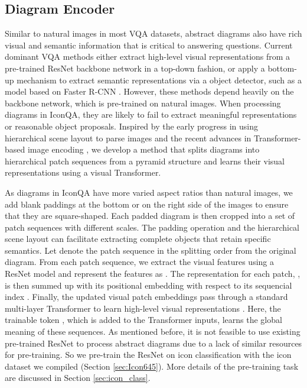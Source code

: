 \documentclass{article}
\begin{document}
\subsection{Diagram Encoder}
Similar to natural images in most VQA datasets, abstract diagrams also have rich visual and semantic information that is critical to answering questions. Current dominant VQA methods \cite{antol2015vqa, Anderson2017up,Kim2018,gao2019dynamic,yu2019mcan,jiang2020defense,agarwal2020towards} either extract high-level visual representations from a pre-trained ResNet backbone network \cite{he2016deep} in a top-down fashion, or apply a bottom-up mechanism to extract semantic representations via a object detector, such as a model based on Faster R-CNN \cite{ren2015faster}. However, these methods depend heavily on the backbone network, which is pre-trained on natural images. When processing diagrams in IconQA, they are likely to fail to extract meaningful representations or reasonable object proposals. Inspired by the early progress in using hierarchical scene layout to parse images \cite{li2010object, zhu2015reconfigurable,wang2015learning} and the recent advances in Transformer-based image encoding \cite{lu2019vilbert, li2019visualbert,wonjae2021an}, we develop a method that splits diagrams into hierarchical patch sequences from a pyramid structure and learns their visual representations using a visual Transformer.

As diagrams in IconQA have more varied aspect ratios than natural images, we add blank paddings at the bottom or on the right side of the images to ensure that they are square-shaped. Each padded diagram is then cropped into a set of patch sequences with different scales. The padding operation and the hierarchical scene layout can facilitate extracting complete objects that retain specific semantics. Let  denote the patch sequence in the splitting order from the original diagram. From each patch sequence, we extract the visual features using a ResNet model and represent the features as . The representation for each patch, , is then summed up with its positional embedding with respect to its sequencial index . Finally, the updated visual patch embeddings pass through a standard multi-layer Transformer \cite{vaswani2017attention} to learn high-level visual representations . Here, the trainable token , which is added to the Transformer inputs, learns the global meaning of these sequences. As mentioned before, it is not feasible to use existing pre-trained ResNet to process abstract diagrams due to a lack of similar resources for pre-training. So we pre-train the ResNet on icon classification with the icon dataset we compiled (Section \ref{sec:Icon645}). More details of the pre-training task are discussed in Section \ref{sec:icon_class}.
\end{document}
